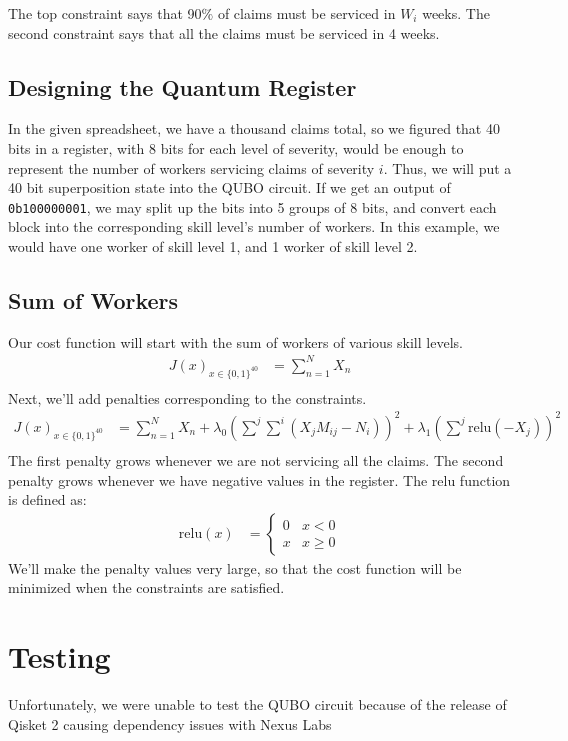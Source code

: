 \documentclass[12pt]{article}
\begin{document}
The top constraint says that 90$\%$ of claims must be serviced in $W_i$ weeks.
The second constraint says that all the claims must be serviced in 4 weeks.

\subsection*{Designing the Quantum Register}
In the given spreadsheet, we have a thousand claims total, so we figured that 40 bits in a register,
with 8 bits for each level of severity, would be enough to represent the number of workers servicing claims of severity $i$.
Thus, we will put a 40 bit superposition state into the QUBO circuit.
If we get an output of \texttt{0b100000001}, we may split up the bits into 5 groups of 8 bits, and
convert each block into the corresponding skill level's number of workers. In this example,
we would have one worker of skill level 1, and 1 worker of skill level 2.

\subsection*{Sum of Workers}
Our cost function will start with the sum of workers of various skill levels.
\begin{align*}
    J(x)_{x \in \{0,1\}^{40}} &= \sum_{n=1}^{N} X_{n}\\
\end{align*}
Next, we'll add penalties corresponding to the constraints.
\begin{align*}
    J(x)_{x \in \{0,1\}^{40}} &= \sum_{n=1}^{N} X_{n} +
    \lambda_0\left(\sum^{j}\sum^{i}\left(X_{j}M_{ij} - N_{i}\right)\right)^2 + \lambda_1\left(\sum^{j} \text{relu}(-X_{j})\right)^2\\
\end{align*}
\newpage
\noindent
The first penalty grows whenever we are not servicing all the claims.
The second penalty grows whenever we have negative values in the register.
The relu function is defined as:
\begin{align*}
    \text{relu}(x) &= \begin{cases}
        0 & x < 0\\
        x & x \geq 0
    \end{cases}
\end{align*}
We'll make the penalty values very large, so that the cost function will be minimized when the constraints are satisfied.
\section*{Testing}
Unfortunately, we were unable to test the QUBO circuit because of the release of Qisket 2 causing
dependency issues with Nexus Labs
\end{document}
